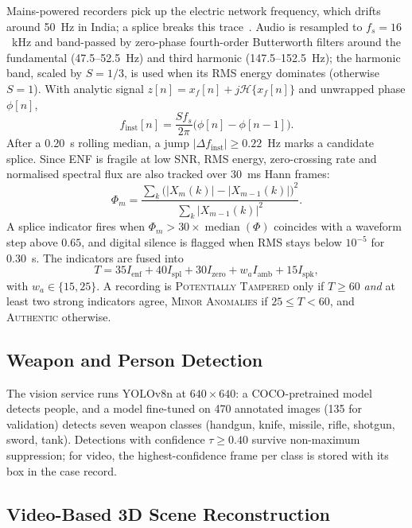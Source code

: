 \documentclass[conference]{IEEEtran}
\begin{document}
Mains-powered recorders pick up the electric network frequency, which drifts around 50~Hz in India; a splice breaks this trace~\cite{ngharamike2023}. Audio is resampled to $f_s=16$~kHz and band-passed by zero-phase fourth-order Butterworth filters around the fundamental (47.5--52.5~Hz) and third harmonic (147.5--152.5~Hz); the harmonic band, scaled by $S=1/3$, is used when its RMS energy dominates (otherwise $S=1$). With analytic signal $z[n]=x_f[n]+j\mathcal H\{x_f[n]\}$ and unwrapped phase $\phi[n]$,
\begin{equation}
f_{\text{inst}}[n]=\frac{S f_s}{2\pi}\bigl(\phi[n]-\phi[n-1]\bigr).
\label{eq:enf}
\end{equation}
After a 0.20~s rolling median, a jump $|\Delta f_{\text{inst}}|\ge0.22$~Hz marks a candidate splice. Since ENF is fragile at low SNR, RMS energy, zero-crossing rate and normalised spectral flux are also tracked over 30~ms Hann frames:
\begin{equation}
\Phi_m=\frac{\sum_k\bigl(|X_m(k)|-|X_{m-1}(k)|\bigr)^2}{\sum_k|X_{m-1}(k)|^2}.
\label{eq:flux}
\end{equation}
A splice indicator fires when $\Phi_m>30\times\operatorname{median}(\Phi)$ coincides with a waveform step above $0.65$, and digital silence is flagged when RMS stays below $10^{-5}$ for 0.30~s. The indicators are fused into
\begin{equation}
T=35I_{\text{enf}}+40I_{\text{spl}}+30I_{\text{zero}}+w_aI_{\text{amb}}+15I_{\text{spk}},
\label{eq:tamper}
\end{equation}
with $w_a\in\{15,25\}$. A recording is \textsc{Potentially Tampered} only if $T\ge60$ \emph{and} at least two strong indicators agree, \textsc{Minor Anomalies} if $25\le T<60$, and \textsc{Authentic} otherwise.

\subsection{Weapon and Person Detection}
\label{subsec:vision}

The vision service runs YOLOv8n at $640\times640$: a COCO-pretrained model detects people, and a model fine-tuned on 470 annotated images (135 for validation) detects seven weapon classes (handgun, knife, missile, rifle, shotgun, sword, tank). Detections with confidence $\tau\ge0.40$ survive non-maximum suppression; for video, the highest-confidence frame per class is stored with its box in the case record.

\subsection{Video-Based 3D Scene Reconstruction}
\label{subsec:photo}
\end{document}
